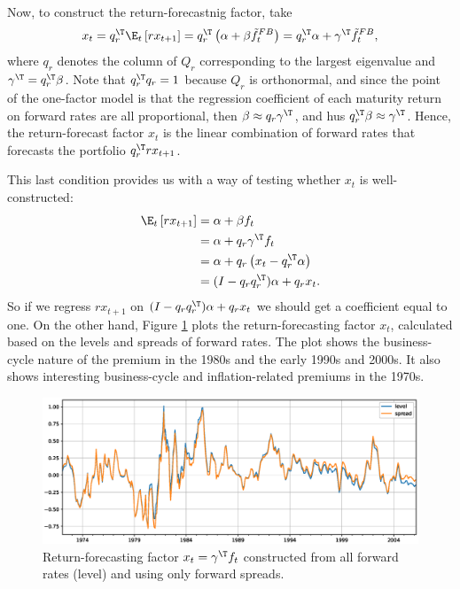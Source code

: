 Now, to construct the return-forecastnig factor, take
\begin{equation}
	x_t = q_r^\T \E_t\left[rx_{t+1}\right] = q_r^\T\left(\alpha + \beta \tilde{f}_t^{FB}\right) = q_r^\T \alpha + \gamma^\T \tilde{f}_t^{FB},
\end{equation}
where $q_r$ denotes the column of $Q_r$ corresponding to the largest eigenvalue and $\gamma^\T = q_r^\T \beta$. Note that $q_r^\T q_r = 1$ because $Q_r$ is orthonormal, and since the point of the one-factor model is that the regression coefficient of each maturity return on forward rates are all proportional, then $\beta \approx q_r \gamma^\T$, and hus $q_r^\T \beta \approx \gamma^\T$. Hence, the return-forecast factor $x_t$ is the linear combination of forward rates that forecasts the portfolio $q_r^\T rx_{t+1}$.

This last condition provides us with a way of testing whether $x_t$ is well-constructed:
\begin{equation}\label{eq:28}
	\begin{aligned}
		\E_t\left[rx_{t+1}\right] 	&= \alpha + \beta f_t \\
									&= \alpha + q_r\gamma^\T f_t \\
									&= \alpha + q_r \left(x_t - q_r^\T \alpha\right)\\
									&= (I-q_rq_r^\T)\alpha + q_r x_t.
	\end{aligned}
\end{equation}
So if we regress $rx_{t+1}$ on $ (I-q_rq_r^\T)\alpha + q_r x_t$ we should get a coefficient equal to one. On the other hand, Figure \ref{fig:4} plots the return-forecasting factor $x_t$, calculated based on the levels and spreads of forward rates. The plot shows the business-cycle nature of the premium in the 1980s and the early 1990s and 2000s. It also shows interesting business-cycle and inflation-related premiums in the 1970s.

\begin{figure}[h!]
	\centering
	\caption{Return-forecasting factor $x_t = \gamma^\T f_t$ constructed from all forward rates (level) and using only forward spreads.}\label{fig:4}
	\includegraphics[scale=0.5]{fig/eps/Figure4.eps}
\end{figure}

